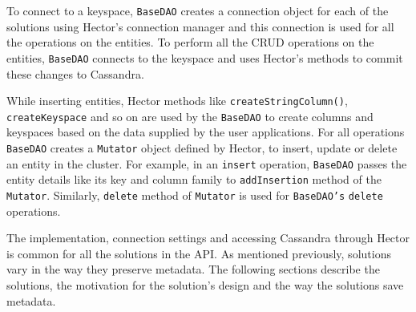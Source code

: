 		To connect to a keyspace, \texttt{BaseDAO} creates a connection object for
		each of the solutions using Hector's  connection manager and this connection
		is used for all the operations on the entities.  To perform all the \ac{CRUD}
		operations on the entities, \texttt{BaseDAO} connects to the keyspace and uses
		Hector's methods to commit these changes to Cassandra.  
		
		While inserting	entities, Hector methods like \texttt{createStringColumn()},
		\texttt{createKeyspace} and so on are used by the \texttt{BaseDAO} to create
		columns and keyspaces based on the data supplied by the user
		applications.  For all operations \texttt{BaseDAO} creates a \texttt{Mutator}
		object defined by Hector, to insert, update or delete an entity in the
		cluster.  For example, in an \texttt{insert} operation, \texttt{BaseDAO} passes
		the entity details like its key and column family to \texttt{addInsertion} method of the
		\texttt{Mutator}. Similarly, \texttt{delete} method of \texttt{Mutator} is used
		for \texttt{BaseDAO's} \texttt{delete} operations. 
		
		The implementation, connection settings and accessing Cassandra through Hector
		is common for all the solutions in the \ac{API}.  As mentioned previously,
		solutions vary in the way they preserve metadata. 
		The following sections describe the solutions, the motivation for the
		solution's design and the way the solutions save metadata. 
		
	
